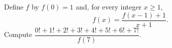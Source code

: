 Define $f$ by $f(0)=1$ and, for every integer $x\ge1$,
\[f(x)=\dfrac{f(x-1)+1}{x+1}.\]
Compute $\dfrac{0!+1!+2!+3!+4!+5!+6!+7!}{f(7)}$.

